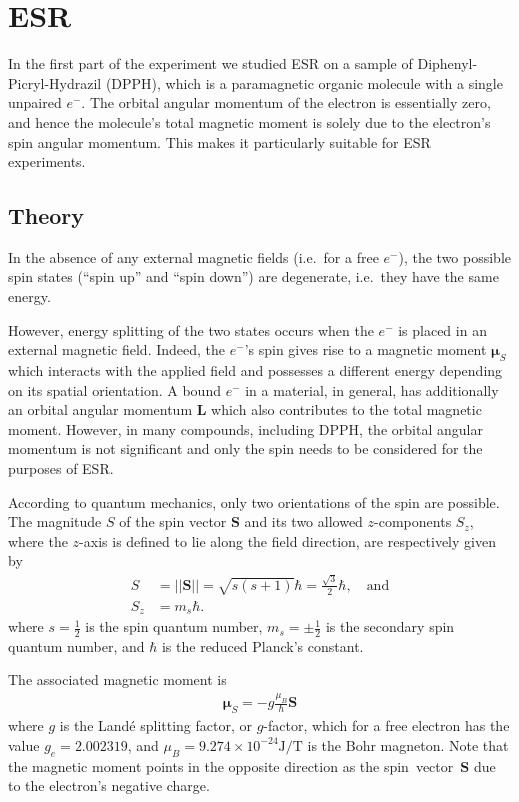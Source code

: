 \documentclass[a4paper]{jpconf}
\numberwithin{equation}{section}
\begin{document}
\section{ESR}
In the first part of the experiment we studied ESR on a sample of Diphenyl-Picryl-Hydrazil (DPPH), which is a paramagnetic organic molecule with a single unpaired $e^-$. The orbital angular momentum of the electron is essentially zero,    %
and hence the molecule\textquoteright s total magnetic moment is solely due to the electron\textquoteright s spin angular momentum. This makes it particularly suitable for ESR experiments.
 
\subsection{Theory}
In the absence of any external magnetic fields (i.e.\ for a free $e^-$), the two possible spin states (``spin up'' and ``spin down'') are degenerate, i.e.\ they have the same energy.

However, energy splitting of the two states occurs when the $e^-$ is placed in an external magnetic field. Indeed, the $e^-$'s spin gives rise to a magnetic moment $\bm{\mu}_S$ which interacts with the applied field and possesses a different energy depending on its spatial orientation. A bound $e^-$ in a material, in general, has additionally an orbital angular momentum $\mathbf{L}$ which also contributes to the total magnetic moment. However, in many compounds, including DPPH, the orbital angular momentum is not significant and only the spin needs to be considered for the purposes of ESR. 

According to quantum mechanics, only two orientations of the spin are possible. The magnitude $S$ of the spin vector $\mathbf{S}$ and its two allowed $z$-components $S_z$, where the $z$-axis is defined to lie along the field direction, are respectively given by
\begin{align}
	S &= \lvert\lvert\mathbf{S}\rvert\rvert = \sqrt{s(s+1)}\hbar = \tfrac{\sqrt{3}}{2}\hbar,  \quad \text{and} \nonumber \\
	S_z &= m_s \hbar. \label{eqn: magnetic moment z-projection}
\end{align}
where $s=\tfrac12$ is the spin quantum number, $m_s=\pm\tfrac12$ is the secondary spin quantum number, and $\hbar$ is the reduced Planck\textquoteright s constant.

The associated magnetic moment is
\begin{align}
	\bm{\mu}_S = - g \frac{\mu_B}{\hbar} \mathbf{S} \label{eqn: magnetic moment}
\end{align}
where $g$ is the Land\'e splitting factor, or $g$-factor, which for a free electron has the value $g_e = 2.002319$, and $\mu_B = 9.274 \times 10^{-24} \si{\joule\per\tesla}$ is the Bohr magneton. Note that the magnetic moment points in the opposite direction as the spin~vector~$\mathbf{S}$ due to the electron's negative charge.
\end{document}
